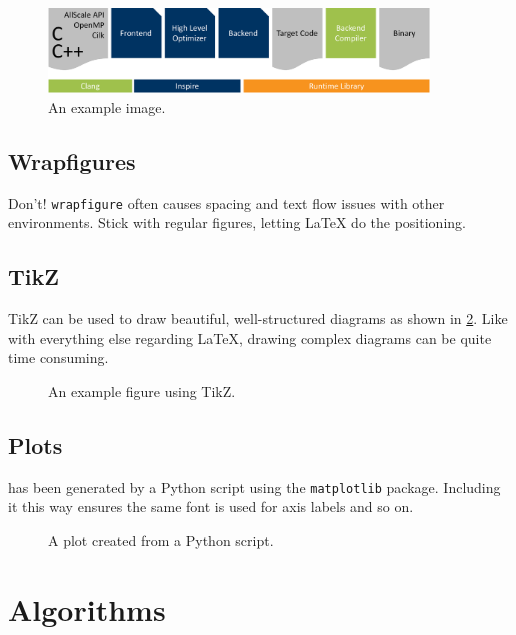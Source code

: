 \begin{figure}
	\centering
	\includegraphics[width=0.9\textwidth]{images/example.pdf}
	\caption{An example image.}
	\label{fig:some_figure}
\end{figure}

\subsection{Wrapfigures}

Don't!
\texttt{wrapfigure} often causes spacing and text flow issues with other environments.
Stick with regular figures, letting \LaTeX{} do the positioning.

\subsection{TikZ}

TikZ can be used to draw beautiful, well-structured diagrams as shown in \cref{fig:tikz_figure}.
Like with everything else regarding \LaTeX, drawing complex diagrams can be quite time consuming.

\begin{figure}
	\centering
	
	\caption{An example figure using TikZ.}
	\label{fig:tikz_figure}
\end{figure}

\subsection{Plots}

 has been generated by a Python script using the \texttt{matplotlib} package.
Including it this way ensures the same font is used for axis labels and so on.

\begin{figure}
	\centering
	
	\caption{A plot created from a Python script.}
	\label{fig:some_plot}
\end{figure}

\section{Algorithms}

